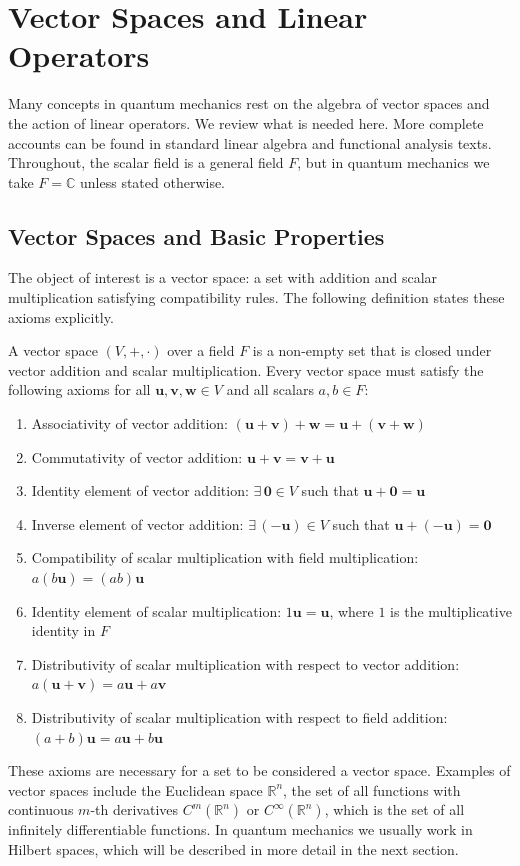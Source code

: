 \section{Vector Spaces and Linear Operators}\label{sec:vector_spaces_and_linear_operators}
Many concepts in quantum mechanics rest on the algebra of vector spaces and the action of linear operators. We review what is needed here. More complete accounts can be found in standard linear algebra and functional analysis texts. Throughout, the scalar field is a general field $F$, but in quantum mechanics we take $F=\mathbb{C}$ unless stated otherwise.
\subsection{Vector Spaces and Basic Properties}\label{sec:vector_spaces_basic_properties}
The object of interest is a vector space: a set with addition and scalar multiplication satisfying compatibility rules. The following definition states these axioms explicitly.
\begin{definition}
A vector space $(V,+,\cdot)$ over a field $F$ is a non-empty set that is closed under vector addition and scalar multiplication. Every vector space must satisfy the following axioms for all $\symbf{u},\symbf{v},\symbf{w}\in V$ and all scalars $a,b\in F$:
\begin{enumerate}\def\labelenumi{\arabic{enumi}.}
\item Associativity of vector addition: $(\symbf{u}+\symbf{v})+\symbf{w}=\symbf{u}+(\symbf{v}+\symbf{w})$
\item Commutativity of vector addition: $\symbf{u}+\symbf{v}=\symbf{v}+\symbf{u}$
\item Identity element of vector addition: $\exists\,\symbf{0}\in V$ such that $\symbf{u}+\symbf{0}=\symbf{u}$
\item Inverse element of vector addition: $\exists\,(-\symbf{u})\in V$ such that $\symbf{u}+(-\symbf{u})=\symbf{0}$
\item Compatibility of scalar multiplication with field multiplication: $a(b\symbf{u})=(ab)\symbf{u}$
\item Identity element of scalar multiplication: $1\symbf{u}=\symbf{u}$, where $1$ is the multiplicative identity in $F$
\item Distributivity of scalar multiplication with respect to vector addition: $a(\symbf{u}+\symbf{v})=a\symbf{u}+a\symbf{v}$
\item Distributivity of scalar multiplication with respect to field addition: $(a+b)\symbf{u}=a\symbf{u}+b\symbf{u}$
\end{enumerate}
\end{definition}
These axioms are necessary for a set to be considered a vector space. Examples of vector spaces include the Euclidean space $\mathbb{R}^n$, the set of all functions with continuous $m$-th derivatives $C^m(\mathbb{R}^n)$ or $C^\infty(\mathbb{R}^n)$, which is the set of all infinitely differentiable functions. In quantum mechanics we usually work in Hilbert spaces, which will be described in more detail in the next section.

